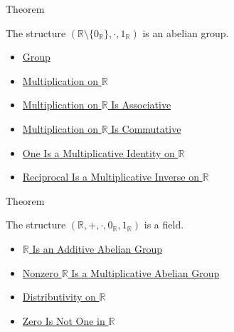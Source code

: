 \begin{theorembox}{Theorem}
\begin{theorem}
\label{thm:r-nonzero-multiplicative-abelian-group}
The structure $(\mathbb{R}\setminus\{0_{\mathbb{R}}\},\cdot,1_{\mathbb{R}})$
is an abelian group.
\end{theorem}
\end{theorembox}

\begin{dependencies}
\begin{itemize}
  \item \hyperref[def:group]{Group}
  \item \hyperref[def:multiplication-on-r]{Multiplication on $\mathbb{R}$}
  \item \hyperref[thm:multiplication-on-r-associative]{Multiplication on $\mathbb{R}$ Is Associative}
  \item \hyperref[thm:multiplication-on-r-commutative]{Multiplication on $\mathbb{R}$ Is Commutative}
  \item \hyperref[thm:one-multiplicative-identity-on-r]{One Is a Multiplicative Identity on $\mathbb{R}$}
  \item \hyperref[thm:reciprocal-multiplicative-inverse-on-r]{Reciprocal Is a Multiplicative Inverse on $\mathbb{R}$}
\end{itemize}
\end{dependencies}

\begin{theorembox}{Theorem}
\begin{theorem}
\label{thm:r-is-a-field}
The structure $(\mathbb{R},+,\cdot,0_{\mathbb{R}},1_{\mathbb{R}})$ is a field.
\end{theorem}
\end{theorembox}

\begin{dependencies}
\begin{itemize}
  \item \hyperref[thm:r-additive-abelian-group]{$\mathbb{R}$ Is an Additive Abelian Group}
  \item \hyperref[thm:r-nonzero-multiplicative-abelian-group]{Nonzero $\mathbb{R}$ Is a Multiplicative Abelian Group}
  \item \hyperref[thm:distributivity-on-r]{Distributivity on $\mathbb{R}$}
  \item \hyperref[thm:zero-not-one-in-r]{Zero Is Not One in $\mathbb{R}$}
\end{itemize}
\end{dependencies}

